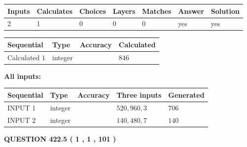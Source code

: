 \documentclass{ctexart}
\begin{document}
 
\noindent{}
 
 

 
   
   
   
   
\noindent\begin{tabular}{|l|l|l|l|l|l|l|}
 \hline
Inputs & Calculates & Choices & Layers & Matches & Answer & Solution \\ \hline
 2  & 
 1  & 
 0
  & 
 0  & 
 0  & 
  yes & 
  yes 
  \\ \hline
 \end{tabular}
   
   
   
   
\noindent{}
   
   
  
  
\noindent\begin{tabular}{|l|l|l|l|}
\hline
 Sequential & Type & Accuracy & Calculated \\ 
\hline
 
 
  Calculated $  1 $ & integer &  & 
  $ 846 $ 
 \\  \hline  
 \end{tabular}
   
   
   
   
\noindent\vspace{0.1in}\hspace{-0.08in} {\textbf{\Large{All inputs: }}}
   
   
  
  
\noindent\begin{tabular}{|l|l|l|l|l|}
\hline
 Sequential & Type & Accuracy & Three inputs & Generated \\ 
\hline
 
 
  INPUT $  1 $ & integer &  & $
 520
 , 
 960
 , 
 3
 $ & $ 706 $ 
 \\  \hline  
 
 
  INPUT $  2 $ & integer &  & $
 140
 , 
 480
 , 
 7
 $ & $ 140 $ 
 \\  \hline  
 \end{tabular}
   
   
  
\vspace{0.2in}
  
{\textbf{\Large{QUESTION
422.5 
 ( 1 , 1 , 101 )
}}}
  
  
 
\end{document}
